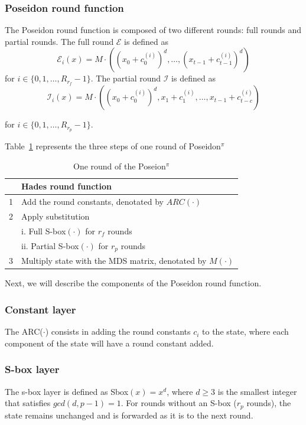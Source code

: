 \subsubsection*{Poseidon round function}
The Poseidon round function is composed of two different rounds: full rounds and partial rounds.
The full round $\mathcal{E}$ is defined as
\begin{equation}
    \mathcal{E}_i(x) = M\cdot\left(\left(x_0+c_0^{(i)}\right)^d,\dots,\left(x_{t-1}+c_{t-1}^{(i)}\right)^d\right)
\end{equation}
for $i \in \{0,1,\dots,R_{r_f}-1\}$. The partial round $\mathcal{I}$ is defined as
\begin{equation}
    \mathcal{I}_i(x) = M\cdot\left(\left(x_0+c_0^{(i)}\right)^d,x_1+c_1^{(i)},\dots,x_{t-1}+c_{t-c}^{(i)}\right)
\end{equation}

for $i \in \{0,1,\dots,R_{r_p}-1\}$.

Table~\ref{tab:pos-round} represents the three steps of one round of Poseidon$^\pi$
\begin{table}[htbp]
    \centering
    \begin{tabular}{rl}
        \toprule
        & Hades round function \\
        \midrule
        1 & Add the round constants, denotated by $ARC(\cdot)$ \\
        2 & Apply substitution \\
        & i.  Full S-box$(\cdot)$ for $r_f$ rounds \\
        & ii. Partial S-box$(\cdot)$ for $r_p$ rounds \\
        3 & Multiply state with the MDS matrix, denotated by $M(\cdot)$ \\
    \end{tabular}
    \caption{One round of the Poseion$^\pi$}
    \label{tab:pos-round}
\end{table}

Next, we will describe the components of the Poseidon round function.

\subsubsection*{Constant layer}
The ARC($\cdot$) consists in adding the round constants $c_i$ to the state, where each component of the state will have a round constant added.

\subsubsection*{S-box layer}
The s-box layer is defined as Sbox$(x) = x^d$, where $d \geq 3$ is the smallest integer that satisfies $gcd(d,p-1) = 1$. For rounds without an S-box ($r_p$ rounds), the state remains unchanged and is forwarded as it is to the next round.

